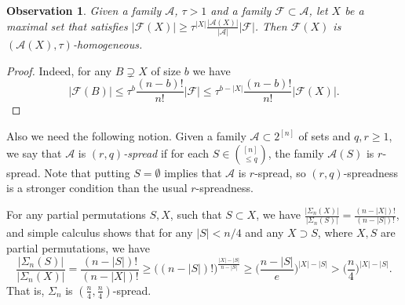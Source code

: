 \documentclass[11pt]{extarticle}
\numberwithin{equation}{section} %
\theoremstyle{plain}
\newtheorem{obs}[thm]{Observation}
\theoremstyle{definition}
\newcommand{\ff}{\mathcal{F}}
\newcommand{\m}{\mathcal}
\begin{document}
\begin{obs}\label{obs3} Given a family $\m{A}$, $\tau>1$ and a family $\ff \subset \m{A}$, let $X$ be a maximal set that satisfies $|\ff(X)|\ge\tau^{|X|} \frac{|\m{A}(X)|}{|\m{A}|}|\ff|$. Then $\ff(X)$ is $(\m{A}(X),\tau)$-homogeneous.
\end{obs}
\begin{proof}
Indeed, for any $B\supsetneq X$ of size $b$ we have
$$|\ff(B)|\le \tau^b \frac{(n-b)!}{n!}|\ff|\le\tau^{b-|X|} \frac{(n-b)!}{n!} |\ff(X)|.$$
\end{proof}

Also we need the following notion.
Given a family $\m{A}\subset 2^{[n]}$ of sets and $q,r\ge 1$, we say that $\m{A}$ is {\it $(r,q)$-spread} if for each $S\in {[n]\choose \le q}$, the family $\m{A}(S)$ is $r$-spread. Note that putting $S = \emptyset$ implies that $\m{A}$ is $r$-spread, so $(r, q)$-spreadness is a stronger condition than the usual $r$-spreadness.

For any partial permutations $S,X$, such that $S\subset X$, we have $\frac{|\Sigma_n(X)|}{|\Sigma_n(S)|} = \frac {(n-|X|)!}{(n-|S|)!}$, and simple calculus shows that for any $|S|<n/4$ and any $X\supset S$, where $X,S$ are partial permutations, we have
$$\frac{|\Sigma_n(S)|}{|\Sigma_n(X)|} = \frac {(n-|S|)!}{(n-|X|)!}\ge \big((n-|S|)!\big)^{\frac{|X|-|S|}{n-|S|}}\ge \Big(\frac{n-|S|}{e}\Big)^{|X|-|S|}>\Big(\frac n4\Big)^{|X|-|S|}.$$
That is, $\Sigma_n$ is $(\frac{n}{4}, \frac{n}{4})$-spread.
\end{document}
